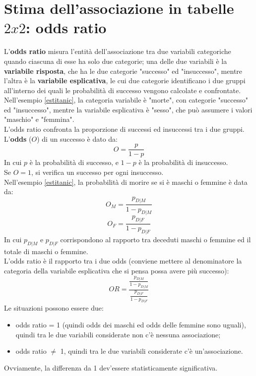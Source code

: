 \documentclass[10pt, draft]{book}
\begin{document}
\section{Stima dell'associazione in tabelle \texorpdfstring{$2 x 2$}{Lg}: odds ratio}

L'\textbf{odds ratio} misura l'entità dell'associazione tra due variabili categoriche quando ciascuna di esse ha solo due categorie; una delle due variabili è la \textbf{variabile risposta}, che ha le due categorie "successo" ed "insuccesso", mentre l'altra è la \textbf{variabile esplicativa}, le cui due categorie identificano i due gruppi all'interno dei quali le probabilità di successo vengono calcolate e confrontate.
\\
Nell'esempio \ref{estitanic}, la categoria variabile è "morte", con categorie "successo" ed "insuccesso", mentre la variabile esplicativa è "sesso", che può assumere i valori "maschio" e "femmina".
\\
L'odds ratio confronta la proporzione di successi ed insuccessi tra i due gruppi.
\\
L'\textbf{odds} ($O$) di un successo è dato da:
\begin{equation}
O = \frac{p}{1-p}
\end{equation}
In cui $p$ è la probabilità di successo, e $1-p$ è la probabilità di insuccesso.
\\
Se $O = 1$, si verifica un successo per ogni insuccesso.
\\
Nell'esempio \ref{estitanic}, la probabilità di morire se si è maschi o femmine è data da:
\begin{equation}
O_M = \frac{p_{D|M}}{1-p_{D|M}}
\end{equation}
\begin{equation}
O_F = \frac{p_{D|F}}{1-p_{D|F}}
\end{equation}
In cui $p_{D|M}$ e $p_{D|F}$ corrispondono al rapporto tra deceduti maschi o femmine ed il totale di maschi o femmine.
\\
L'odds ratio è il rapporto tra i due odds (conviene mettere al denominatore la categoria della variabile esplicativa che si pensa possa avere più successo):
\begin{equation}
OR = \frac{\frac{p_{D|M}}{1-p_{D|M}}}{\frac{p_{D|F}}{1-p_{D|F}}}
\end{equation}
Le situazioni possono essere due:
\begin{itemize}
    \item odds ratio = 1 (quindi odds dei maschi ed odds delle femmine sono uguali), quindi tra le due variabili considerate non c'è nessuna associazione;
    \item odds ratio $\neq$ 1, quindi tra le due variabili considerate c'è un'associazione.
\end{itemize}
Ovviamente, la differenza da 1 dev'essere statisticamente significativa.
\end{document}
